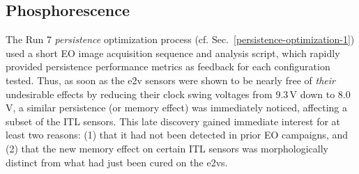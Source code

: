 %
%
%

%



\subsection{Phosphorescence}\label{phosphorescence}

The Run 7 {\it persistence} optimization process (cf. Sec.~\ref{persistence-optimization-1}) used a short EO image acquisition sequence and analysis script, which rapidly provided persistence performance metrics as feedback for each configuration tested. Thus, as soon as the e2v sensors were shown to be nearly free of {\it their} undesirable effects by reducing their clock swing voltages from 9.3\,V down to 8.0\,V, a similar persistence (or memory effect) was immediately noticed, affecting a subset of the ITL sensors. This late discovery gained immediate interest for at least two reasons: (1) that it had not been detected in prior EO campaigns, and (2) that the new memory effect on certain ITL sensors was morphologically distinct from what had just been cured on the e2vs. 

